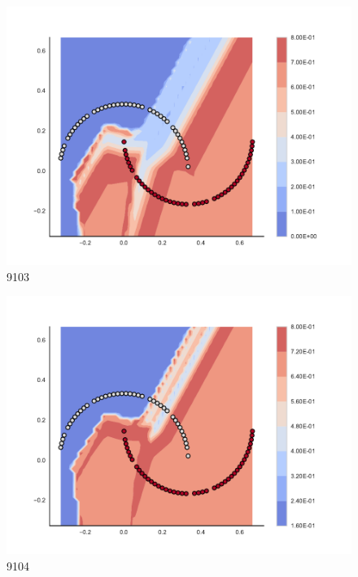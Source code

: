 \begin{subfigure}[b]{0.09\textwidth}
    \includegraphics[clip, trim=2.35cm 1.75cm 4.5cm 0cm,width=\textwidth]{img/convergence/9103.pdf}
    \caption{9103}
    \label{fig:convergence_9103}
\end{subfigure}
%
\begin{subfigure}[b]{0.09\textwidth}
    \includegraphics[clip, trim=2.35cm 1.75cm 4.5cm 0cm,width=\textwidth]{img/convergence/9104.pdf}
    \caption{9104}
    \label{fig:convergence_9104}
\end{subfigure}
%

